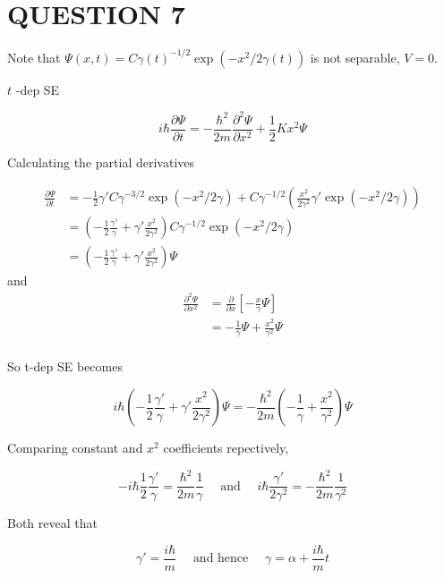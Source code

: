 \documentclass[a4paper]{article}
\begin{document}
\section{QUESTION 7}

Note that $ \Psi(x,t) = C \gamma(t)^{-1/2} \exp(-x^{2}/2\gamma(t)) $ is not separable, $ V = 0 $.


$ t $ -dep SE 

\[ i \hbar \frac{\partial \Psi }{\partial t} = - \frac{\hbar^{2}}{2m} \frac{\partial^{2} \Psi }{\partial x^{2}} + \frac{1}{2}Kx^{2} \Psi \]

Calculating the partial derivatives

\begin{align*}
\frac{\partial \Psi }{\partial t}& = -\frac{1}{2} \gamma' C \gamma^{-3/2} \exp(-x^{2}/2\gamma)  + C \gamma^{-1/2}  \left(\frac{x^{2}}{2 \gamma^{2}} \gamma' \exp(-x^{2}/2\gamma) \right)    \\
& = \left( - \frac{1}{2} \frac{\gamma'}{\gamma} + \gamma' \frac{x^{2}}{2 \gamma^{2}} \right) C \gamma^{-1/2} \exp(-x^{2}/2\gamma) \\
& = \left( - \frac{1}{2} \frac{\gamma'}{\gamma} + \gamma' \frac{x^{2}}{2 \gamma^{2}} \right) \Psi
\end{align*}  
and 
\begin{align*}
\frac{\partial^{2} \Psi }{\partial x^{2}} & = \frac{\partial }{\partial x} \left[ -  \frac{x}{\gamma} \Psi \right] \\
& =  -  \frac{1}{\gamma} \Psi + \frac{x^{2}}{\gamma^{2}} \Psi   \\
\end{align*}      

So t-dep SE becomes

\[ i \hbar \left( - \frac{1}{2} \frac{\gamma'}{\gamma} + \gamma '\frac{x^{2}}{2 \gamma^{2}} \right) \Psi = - \frac{\hbar^{2}}{2m} \left(   -\frac{1}{\gamma} + \frac{x^{2}}{\gamma^{2}} \right) \Psi  \]    

Comparing constant and $ x^{2} $ coefficients repectively,        

\[ - i \hbar \frac{1}{2} \frac{\gamma'}{\gamma} = \frac{\hbar^{2}}{2m} \frac{1}{\gamma} \quad \text{ and } \quad i\hbar \frac{\gamma'}{2\gamma^{2}} = - \frac{\hbar^{2}}{2m} \frac{1}{\gamma^{2}}   \]

Both reveal that



\[ \gamma' = \frac{i \hbar}{m} \quad \text{ and hence } \quad \gamma = \alpha + \frac{i \hbar}{m} t  \]
\end{document}
